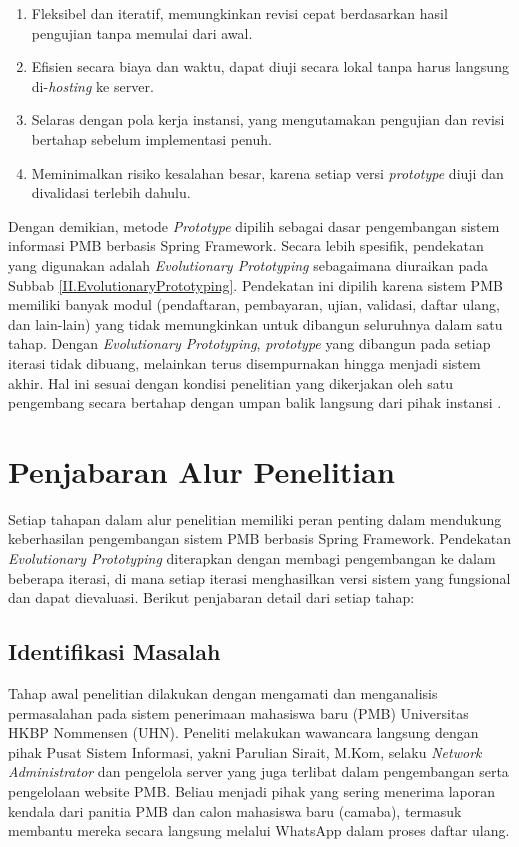 \begin{enumerate}[noitemsep]
	\item Fleksibel dan iteratif, memungkinkan revisi cepat berdasarkan hasil pengujian tanpa memulai dari awal.
	\item Efisien secara biaya dan waktu, dapat diuji secara lokal tanpa harus langsung di-\textit{hosting} ke server.
	\item Selaras dengan pola kerja instansi, yang mengutamakan pengujian dan revisi bertahap sebelum implementasi penuh.
	\item Meminimalkan risiko kesalahan besar, karena setiap versi \textit{prototype} diuji dan divalidasi terlebih dahulu.
\end{enumerate}

Dengan demikian, metode \textit{Prototype} dipilih sebagai dasar pengembangan sistem informasi PMB berbasis Spring Framework. Secara lebih spesifik, pendekatan yang digunakan adalah \textit{Evolutionary Prototyping} sebagaimana diuraikan pada Subbab \ref{II.EvolutionaryPrototyping}. Pendekatan ini dipilih karena sistem PMB memiliki banyak modul (pendaftaran, pembayaran, ujian, validasi, daftar ulang, dan lain-lain) yang tidak memungkinkan untuk dibangun seluruhnya dalam satu tahap. Dengan \textit{Evolutionary Prototyping}, \textit{prototype} yang dibangun pada setiap iterasi tidak dibuang, melainkan terus disempurnakan hingga menjadi sistem akhir. Hal ini sesuai dengan kondisi penelitian yang dikerjakan oleh satu pengembang secara bertahap dengan umpan balik langsung dari pihak instansi \cite{crinnion1991evolutionary, davis1992operational}.\par

\section{Penjabaran Alur Penelitian} \label{III.PenjabaranAlur}
Setiap tahapan dalam alur penelitian memiliki peran penting dalam mendukung keberhasilan pengembangan sistem PMB berbasis Spring Framework. Pendekatan \textit{Evolutionary Prototyping} diterapkan dengan membagi pengembangan ke dalam beberapa iterasi, di mana setiap iterasi menghasilkan versi sistem yang fungsional dan dapat dievaluasi. Berikut penjabaran detail dari setiap tahap:\par

\subsection{Identifikasi Masalah} \label{III.IdentifikasiMasalah}
Tahap awal penelitian dilakukan dengan mengamati dan menganalisis permasalahan pada sistem penerimaan mahasiswa baru (PMB) Universitas HKBP Nommensen (UHN). Peneliti melakukan wawancara langsung dengan pihak Pusat Sistem Informasi, yakni Parulian Sirait, M.Kom, selaku \textit{Network Administrator} dan pengelola server yang juga terlibat dalam pengembangan serta pengelolaan website PMB. Beliau menjadi pihak yang sering menerima laporan kendala dari panitia PMB dan calon mahasiswa baru (camaba), termasuk membantu mereka secara langsung melalui WhatsApp dalam proses daftar ulang.\par

